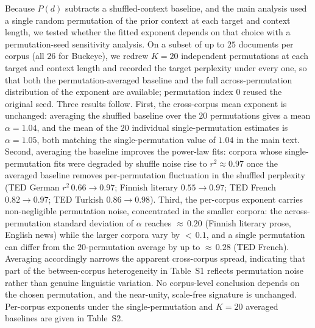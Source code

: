 \documentclass[11pt]{article}
\begin{document}
Because $P(d)$ subtracts a shuffled-context baseline, and the main analysis used a single random
permutation of the prior context at each target and context length, we tested whether the fitted
exponent depends on that choice with a permutation-seed sensitivity analysis. On a subset of up to
$25$ documents per corpus (all $26$ for Buckeye), we redrew $K=20$ independent permutations at each
target and context length and recorded the target perplexity under every one, so that both the
permutation-averaged baseline and the full across-permutation distribution of the exponent are
available; permutation index $0$ reused the original seed. Three results follow. First, the
cross-corpus mean exponent is unchanged: averaging the shuffled baseline over the $20$ permutations
gives a mean $\alpha=1.04$, and the mean of the $20$ individual single-permutation estimates is
$\alpha=1.05$, both matching the single-permutation value of $1.04$ in the main text. Second,
averaging the baseline improves the power-law fits: corpora whose single-permutation fits were
degraded by shuffle noise rise to $r^2\approx0.97$ once the averaged baseline removes per-permutation
fluctuation in the shuffled perplexity (TED German $r^2\,0.66\!\to\!0.97$; Finnish literary
$0.55\!\to\!0.97$; TED French $0.82\!\to\!0.97$; TED Turkish $0.86\!\to\!0.98$). Third, the per-corpus
exponent carries non-negligible permutation noise, concentrated in the smaller corpora: the
across-permutation standard deviation of $\alpha$ reaches ${\approx}\,0.20$ (Finnish literary prose,
English news) while the larger corpora vary by ${<}\,0.1$, and a single permutation can differ from
the $20$-permutation average by up to ${\approx}\,0.28$ (TED French). Averaging accordingly narrows
the apparent cross-corpus spread, indicating that part of the between-corpus heterogeneity in
Table~S1 reflects permutation noise rather than genuine linguistic variation. No corpus-level
conclusion depends on the chosen permutation, and the near-unity, scale-free signature is unchanged.
Per-corpus exponents under the single-permutation and $K=20$ averaged baselines are given in
Table~S2.
\end{document}
